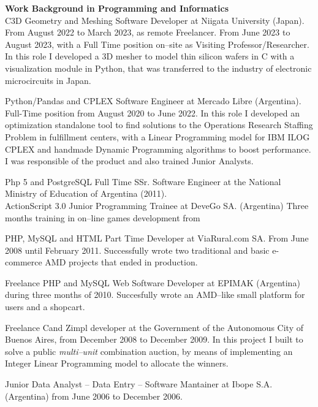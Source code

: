 \textbf{Work Background in Programming and Informatics}\\[6pt]
C\masmas 3D Geometry and Meshing Software Developer at Niigata University
(Japan). 
From August 2022 to March 2023, as remote Freelancer.
From June 2023 to August 2023, with a Full Time position on--site as Visiting
Professor/Researcher.
In this role I developed a 3D mesher to model thin silicon wafers in C\masmas
with a visualization module in Python, that was transferred to the industry of
electronic microcircuits in Japan.

Python/Pandas and CPLEX Software Engineer at Mercado Libre (Argentina). 
Full-Time position from August 2020 to June 2022. In this role I developed an 
optimization standalone tool to find solutions to the
Operations Research Staffing Problem in fulfillment centers, with
a Linear Programming model for IBM ILOG CPLEX and handmade Dynamic Programming
algorithms to boost performance. I was responsible of the product and also
trained Junior Analysts.

Php 5 and PostgreSQL Full Time SSr. Software Engineer at the
National Ministry of Education of Argentina (2011).\\[4pt]

ActionScript 3.0 Junior Programming Trainee at DeveGo SA. (Argentina)
Three months training in on--line games development from 

PHP, MySQL and HTML Part Time Developer at ViaRural.com SA. From June 2008
until February 2011.
Successfully wrote two traditional and basic e-commerce AMD projects
that ended in production.

Freelance PHP and MySQL Web Software Developer at EPIMAK (Argentina)
during three months of 2010. Succesfully wrote an AMD--like small 
platform for users and a shopcart.

Freelance C\masmas and Zimpl developer at the Government of the 
Autonomous City of Buenos Aires, from December 2008 to December 2009. 
In this project I built \href{https://github.com/alexisjawtu/ilp_auction}
{\color{blue}{an optimization software}} to solve a public
\emph{multi--unit} combination auction, by means of implementing
an Integer Linear Programming model to allocate the winners.

Junior Data Analyst -- Data Entry -- Software Mantainer at Ibope S.A.
(Argentina) from June 2006 to December 2006.

